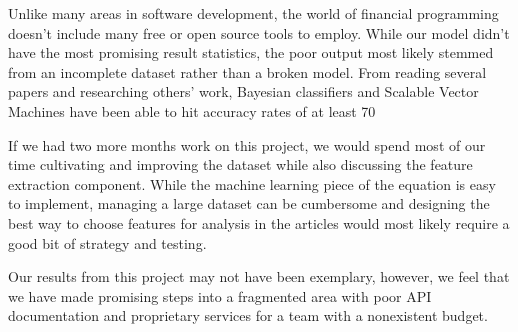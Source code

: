 \documentclass[letterpaper]{article}
\begin{document}
Unlike many areas in software development, the world of financial programming doesn't include many free or open source tools to employ. While our model didn't have the most promising result statistics, the poor output most likely stemmed from an incomplete dataset rather than a broken model. From reading several papers and researching others' work, Bayesian classifiers and Scalable Vector Machines have been able to hit accuracy rates of at least 70%

If we had two more months work on this project, we would spend most of our time cultivating and improving the dataset while also discussing the feature extraction component. While the machine learning piece of the equation is easy to implement, managing a large dataset can be cumbersome and designing the best way to choose features for analysis in the articles would most likely require a good bit of strategy and testing.

Our results from this project may not have been exemplary, however, we feel that we have made promising steps into a fragmented area with poor API documentation and proprietary services for a team with a nonexistent budget.
\end{document}

